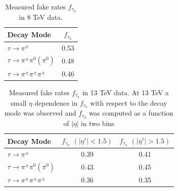 \documentclass[oneside, letterpaper, oldfontcommands]{memoir}
\begin{document}
\begin{table}[htbp]
  \centering
  \begin{tabular}{ | l | c |}
    \hline
    Decay Mode & $f_{\tau_{h}}$ \\ \hline \hline
    $\tau \rightarrow \pi^{\pm}$ & 0.53 \\ \hline
    $\tau \rightarrow \pi^{\pm}\pi^{0} (\pi^{0})$ & 0.48 \\ \hline
    $\tau \rightarrow \pi^{\pm}\pi^{\pm}\pi^{\pm}$& 0.46 \\ \hline
    
  \end{tabular}
  \caption{Measured fake rates $f_{\tau_{h}}$ in 8 TeV data.}
  \label{tab:taufakerate8TeV}
\end{table}

\begin{table}[htbp]
  \centering
  \begin{tabular}{ | l | c | c |}
    \hline
    Decay Mode & $f_{\tau_{h}}$ $\left(|\eta^{\tau}|<1.5\right)$ & $f_{\tau_{h}}$ $\left(|\eta^{\tau}|>1.5\right)$ \\ \hline \hline
    $\tau \rightarrow \pi^{\pm}$ & 0.39 & 0.41 \\ \hline
    $\tau \rightarrow \pi^{\pm}\pi^{0} (\pi^{0})$ & 0.43 & 0.45 \\ \hline
    $\tau \rightarrow \pi^{\pm}\pi^{\pm}\pi^{\pm}$& 0.36 & 0.35 \\ \hline
  \end{tabular}
  \caption{Measured fake rates $f_{\tau_{h}}$ in 13 TeV data. At 13 TeV a small $\eta$ dependence in $f_{\tau_{h}}$ with respect to the decay mode was observed and $f_{\tau_{h}}$ was computed as a function of $|\eta|$ in two bins}
  \label{tab:taufakerate13TeV}
\end{table}
\end{document}
